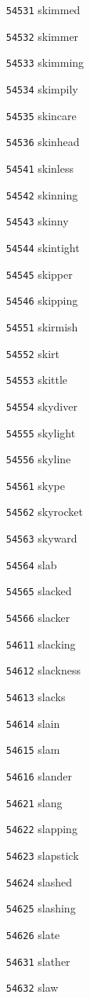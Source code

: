 \documentclass[twoside,11pt]{article}
\begin{document}
\begin{multicols}{5}
\begin{enumerate}
\item[\texttt{54531}] skimmed
\item[\texttt{54532}] skimmer
\item[\texttt{54533}] skimming
\item[\texttt{54534}] skimpily
\item[\texttt{54535}] skincare
\item[\texttt{54536}] skinhead
\item[\texttt{54541}] skinless
\item[\texttt{54542}] skinning
\item[\texttt{54543}] skinny
\item[\texttt{54544}] skintight
\item[\texttt{54545}] skipper
\item[\texttt{54546}] skipping
\item[\texttt{54551}] skirmish
\item[\texttt{54552}] skirt
\item[\texttt{54553}] skittle
\item[\texttt{54554}] skydiver
\item[\texttt{54555}] skylight
\item[\texttt{54556}] skyline
\item[\texttt{54561}] skype
\item[\texttt{54562}] skyrocket
\item[\texttt{54563}] skyward
\item[\texttt{54564}] slab
\item[\texttt{54565}] slacked
\item[\texttt{54566}] slacker
\item[\texttt{54611}] slacking
\item[\texttt{54612}] slackness
\item[\texttt{54613}] slacks
\item[\texttt{54614}] slain
\item[\texttt{54615}] slam
\item[\texttt{54616}] slander
\item[\texttt{54621}] slang
\item[\texttt{54622}] slapping
\item[\texttt{54623}] slapstick
\item[\texttt{54624}] slashed
\item[\texttt{54625}] slashing
\item[\texttt{54626}] slate
\item[\texttt{54631}] slather
\item[\texttt{54632}] slaw

\end{enumerate}
\end{multicols}
\end{document}
